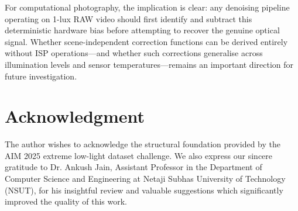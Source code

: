 \documentclass[conference]{IEEEtran}
\begin{document}
For computational photography, the implication is clear: any denoising pipeline operating on 1-lux RAW video should first identify and subtract this deterministic hardware bias before attempting to recover the genuine optical signal. Whether scene-independent correction functions can be derived entirely without ISP operations---and whether such corrections generalise across illumination levels and sensor temperatures---remains an important direction for future investigation.

\section*{Acknowledgment}

The author wishes to acknowledge the structural foundation provided by the AIM 2025 extreme low-light dataset challenge. We also express our sincere gratitude to Dr. Ankush Jain, Assistant Professor in the Department of Computer Science and Engineering at Netaji Subhas University of Technology (NSUT), for his insightful review and valuable suggestions which significantly improved the quality of this work.



\end{document}
